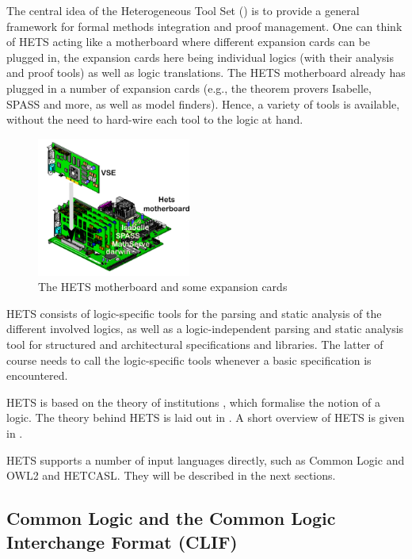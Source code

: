 \documentclass{article}
\newcommand{\normalTEXTSC}[2]{{#1\scriptsize#2}}
\newcommand     {\Hets}{\normalTEXTSC{H}{ETS}\xspace}
\newcommand{\HetCASL}{\normalTEXTSC{H}{ET}\normalTEXTSC{C}{ASL}\xspace}
\begin{document}
The central idea of the Heterogeneous Tool Set (\protect\Hets) is to
provide a general framework for formal methods integration and proof
management. One can think of \Hets acting like a motherboard where
different expansion cards can be plugged in, the expansion cards here
being individual logics (with their analysis and proof tools) as well
as logic translations. The \Hets motherboard already has plugged in
a number of expansion cards (e.g., the theorem provers Isabelle, SPASS
and more, as well as model finders). Hence, a variety of tools is
available, without the need to hard-wire each tool to the logic at
hand.
\begin{figure}
\begin{center}
  \includegraphics[width=0.45\textwidth]{hets-motherboard}
\end{center}
\caption{The \Hets motherboard and some expansion cards}
\end{figure}

\Hets consists of logic-specific tools for the parsing and static
analysis of the different involved logics, as well as a
logic-independent parsing and static analysis tool for structured and
architectural specifications and libraries. The latter of course needs
to call the logic-specific tools whenever a basic specification is
encountered.

\Hets is based on the theory of institutions \cite{GoguenBurstall92},
which formalise the notion of a logic. The theory behind \Hets is laid
out in \cite{Habil}. A short overview of \Hets is given in
\cite{MossakowskiEA06,MossakowskiEtAl07b}.

\Hets supports a number of input languages directly, such as Common
Logic and OWL2 and \HetCASL. They will be described in the next
sections.

\subsection{Common Logic and the Common Logic Interchange Format (CLIF)}
\end{document}
